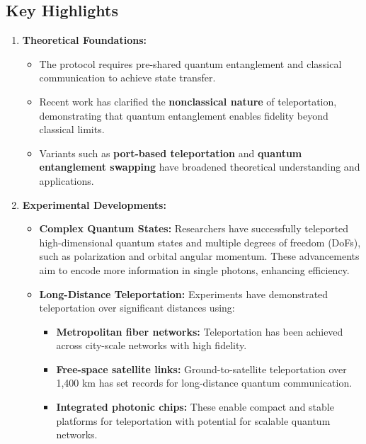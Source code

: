 \documentclass[paper=a4, fontsize=11pt]{scrartcl} %
\numberwithin{figure}{section} %
\numberwithin{table}{section} %
\begin{document}
\subsection*{Key Highlights}
\begin{enumerate}
    \item \textbf{Theoretical Foundations:}
    \begin{itemize}
        \item The protocol requires pre-shared quantum entanglement and classical communication to achieve state transfer.
        \item Recent work has clarified the \textbf{nonclassical nature} of teleportation, demonstrating that quantum entanglement enables fidelity beyond classical limits.
        \item Variants such as \textbf{port-based teleportation} and \textbf{quantum entanglement swapping} have broadened theoretical understanding and applications.
    \end{itemize}
    
    \item \textbf{Experimental Developments:}
    \begin{itemize}
        \item \textbf{Complex Quantum States:} Researchers have successfully teleported high-dimensional quantum states and multiple degrees of freedom (DoFs), such as polarization and orbital angular momentum. These advancements aim to encode more information in single photons, enhancing efficiency.
        \item \textbf{Long-Distance Teleportation:} Experiments have demonstrated teleportation over significant distances using:
        \begin{itemize}
            \item \textbf{Metropolitan fiber networks:} Teleportation has been achieved across city-scale networks with high fidelity.
            \item \textbf{Free-space satellite links:} Ground-to-satellite teleportation over 1,400 km has set records for long-distance quantum communication.
            \item \textbf{Integrated photonic chips:} These enable compact and stable platforms for teleportation with potential for scalable quantum networks.
        \end{itemize}
    \end{itemize}


\end{enumerate}
\end{document}
